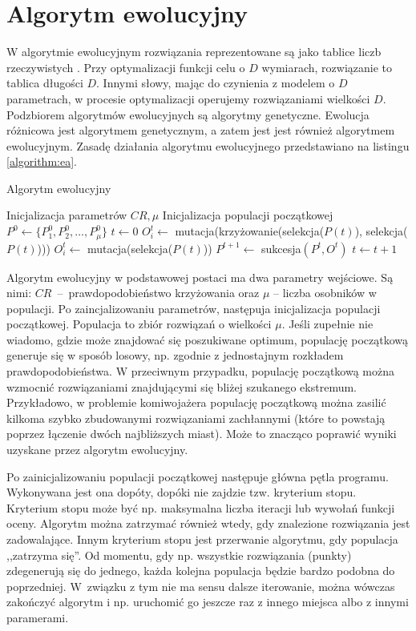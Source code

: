 \documentclass[a4paper,onecolumn,oneside,12pt,wide,floatssmall]{mwrep}
\theoremstyle{definition}
\theoremstyle{plain}%
\theoremstyle{remark}
\begin{document}
\chapter{Algorytm ewolucyjny}

W algorytmie ewolucyjnym rozwiązania reprezentowane są jako tablice liczb rzeczywistych \cite{jarabas}. 
Przy optymalizacji funkcji celu o $D$ wymiarach, rozwiązanie to tablica długości $D$.
Innymi słowy, mając do czynienia z modelem o $D$ parametrach, w procesie optymalizacji operujemy 
rozwiązaniami wielkości $D$. 
Podzbiorem algorytmów ewolucyjnych są algorytmy genetyczne.
Ewolucja różnicowa jest algorytmem genetycznym, a zatem jest jest również algorytmem ewolucyjnym. 
Zasadę działania algorytmu ewolucyjnego przedstawiano na listingu \ref{algorithm:ea}.

\begin{algorithm}[!htb]
\caption{Algorytm ewolucyjny}
\label{algorithm:ea}
\begin{algorithmic}[1]
\State Inicjalizacja parametrów $CR, \mu$
\State Inicjalizacja populacji początkowej $P^0 \gets \{P^0_1, P^0_2, \ldots, P^0_\mu\}$
\State $t \gets 0$
      \State $O^t_i \gets$ mutacja(krzy{\.z}owanie(selekcja($P(t)$), selekcja($P(t)$)))
    \Else
      \State $O^t_i \gets$ mutacja(selekcja($P(t)$))
    \EndIf
  \EndFor
  \State $P^{t+1} \gets$ sukcesja$(P^t, O^t)$
  \State $t \gets t+1$
\EndWhile
\end{algorithmic}
\end{algorithm}

Algorytm ewolucyjny w podstawowej postaci ma dwa parametry wejściowe.
Są nimi: $CR$~--~prawdopodobieństwo krzyżowania oraz $\mu$ -- liczba osobników w populacji.
Po zaincjalizowaniu parametrów, następuja inicjalizacja populacji początkowej. 
Populacja to zbiór rozwiązań o wielkości $\mu$. 
Jeśli zupełnie nie wiadomo, gdzie może znajdować się poszukiwane optimum, 
populację początkową generuje się w sposób losowy, np. zgodnie z jednostajnym rozkładem
prawdopodobieństwa. 
W przeciwnym przypadku, populację początkową można wzmocnić rozwiązaniami znajdującymi się 
bliżej szukanego ekstremum. 
Przykładowo, w problemie komiwojażera populację początkową można zasilić kilkoma
szybko zbudowanymi rozwiązaniami zachłannymi (które to powstają poprzez łączenie dwóch najbliższych 
miast). Może to znacząco poprawić wyniki uzyskane przez algorytm ewolucyjny.

Po zainicjalizowaniu populacji początkowej następuje główna pętla programu. 
Wykonywana jest ona dopóty, dopóki nie zajdzie tzw. kryterium stopu. 
Kryterium stopu może być np. maksymalna liczba iteracji lub wywołań funkcji oceny.
Algorytm można zatrzymać również wtedy, gdy znalezione rozwiązania jest zadowalające. 
Innym kryterium stopu jest przerwanie algorytmu, gdy populacja ,,zatrzyma się''. 
Od momentu, gdy np. wszystkie rozwiązania (punkty) zdegenerują się do jednego, 
każda kolejna populacja będzie bardzo podobna do poprzedniej. 
W związku z tym nie ma sensu dalsze iterowanie, 
można wówczas zakończyć algorytm i np. uruchomić go jeszcze raz z innego miejsca
albo z innymi paramerami.
\end{document}
